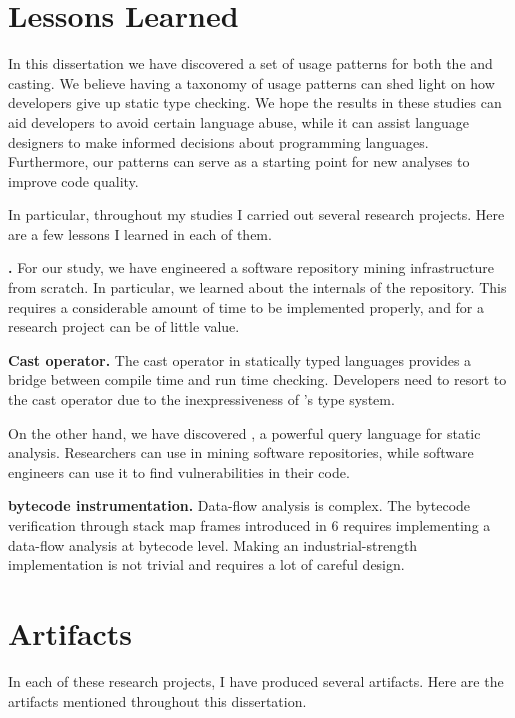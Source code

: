 \section{Lessons Learned}

In this dissertation we have discovered a set of usage patterns for both the \unsafe{} \api{} and casting.
We believe having a taxonomy of usage patterns can shed light on how \java{} developers give up static type checking.
We hope the results in these studies can aid developers to avoid certain language abuse,
while it can assist language designers to make informed decisions about programming languages.
Furthermore,
our patterns can serve as a starting point for new analyses to improve code quality.

In particular,
throughout my \phd{} studies I carried out several research projects.
Here are a few lessons I learned in each of them.

\textbf{\unsafe{} \api{}.}
For our \unsafe{} study,
we have engineered a software repository mining infrastructure from scratch.
In particular,
we learned about the internals of the \mavencentral{} repository.
This requires a considerable amount of time to be implemented properly,
and for a research project can be of little value.

\textbf{Cast operator.}
The cast operator in statically typed languages provides a bridge between compile time and run time checking.
Developers need to resort to the cast operator due to the inexpressiveness of \java{}'s type system. 

On the other hand, we have discovered \ql{},
a powerful query language for static analysis.
Researchers can use \ql{} in mining software repositories,
while software engineers can use it to find vulnerabilities in their code.

\textbf{\java{} bytecode instrumentation.}
Data-flow analysis is complex.
The bytecode verification through stack map frames introduced in \java{} 6 requires implementing a data-flow analysis at bytecode level.
Making an industrial-strength implementation is not trivial
and requires a lot of careful design.


\section{Artifacts}
\newcommand{\urlartifact}[2]{\item{\footnotesize\url{#1}}: #2}

In each of these research projects,
I have produced several artifacts.
Here are the artifacts mentioned throughout this dissertation.

